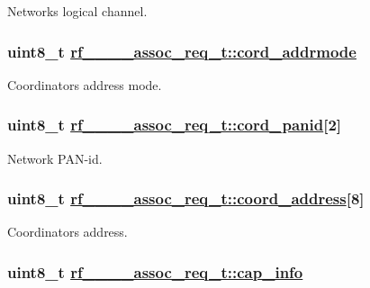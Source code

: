 Networks logical channel. \hypertarget{structrf__802__15__4__assoc__req__t_cfc3ef092d3cccf0b16fccfabfd73254}{
\subsubsection[cord\_\-addrmode]{\setlength{\rightskip}{0pt plus 5cm}uint8\_\-t \hyperlink{structrf__802__15__4__assoc__req__t_cfc3ef092d3cccf0b16fccfabfd73254}{rf\_\_\_\_\-assoc\_\-req\_\-t::cord\_\-addrmode}}}
\label{structrf__802__15__4__assoc__req__t_cfc3ef092d3cccf0b16fccfabfd73254}


Coordinators address mode. \hypertarget{structrf__802__15__4__assoc__req__t_6ef014ac1fe8af11db0b0b73d8e6de99}{
\subsubsection[cord\_\-panid]{\setlength{\rightskip}{0pt plus 5cm}uint8\_\-t \hyperlink{structrf__802__15__4__assoc__req__t_6ef014ac1fe8af11db0b0b73d8e6de99}{rf\_\_\_\_\-assoc\_\-req\_\-t::cord\_\-panid}\mbox{[}2\mbox{]}}}
\label{structrf__802__15__4__assoc__req__t_6ef014ac1fe8af11db0b0b73d8e6de99}


Network PAN-id. \hypertarget{structrf__802__15__4__assoc__req__t_294ed6e2e6aa5baa4908f39f3dd26b9f}{
\subsubsection[coord\_\-address]{\setlength{\rightskip}{0pt plus 5cm}uint8\_\-t \hyperlink{structrf__802__15__4__assoc__req__t_294ed6e2e6aa5baa4908f39f3dd26b9f}{rf\_\_\_\_\-assoc\_\-req\_\-t::coord\_\-address}\mbox{[}8\mbox{]}}}
\label{structrf__802__15__4__assoc__req__t_294ed6e2e6aa5baa4908f39f3dd26b9f}


Coordinators address. \hypertarget{structrf__802__15__4__assoc__req__t_c3fa6e34dd008a9fd04ef877a3127e40}{
\subsubsection[cap\_\-info]{\setlength{\rightskip}{0pt plus 5cm}uint8\_\-t \hyperlink{structrf__802__15__4__assoc__req__t_c3fa6e34dd008a9fd04ef877a3127e40}{rf\_\_\_\_\-assoc\_\-req\_\-t::cap\_\-info}}}
\label{structrf__802__15__4__assoc__req__t_c3fa6e34dd008a9fd04ef877a3127e40}


